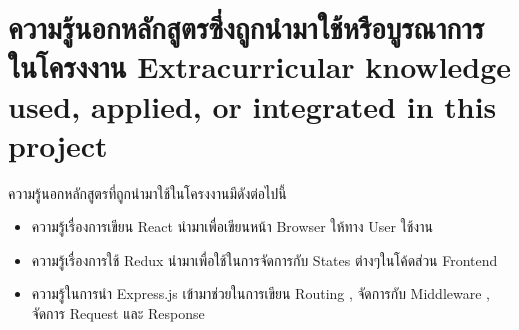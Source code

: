 \section{\ifcpe%
ความรู้นอกหลักสูตรซึ่งถูกนำมาใช้หรือบูรณาการในโครงงาน
\else%
Extracurricular knowledge used, applied, or integrated in this project
\fi
}

ความรู้นอกหลักสูตรที่ถูกนำมาใช้ในโครงงานมีดังต่อไปนี้
\begin{itemize}
  \item ความรู้เรื่องการเขียน React นำมาเพื่อเขียนหน้า Browser ให้ทาง User ใช้งาน
  \item ความรู้เรื่องการใช้ Redux นำมาเพื่อใช้ในการจัดการกับ States ต่างๆในโค้ดส่วน Frontend
  \item ความรู้ในการนำ Express.js เข้ามาช่วยในการเขียน Routing , จัดการกับ Middleware , จัดการ Request และ Response
\end{itemize}
